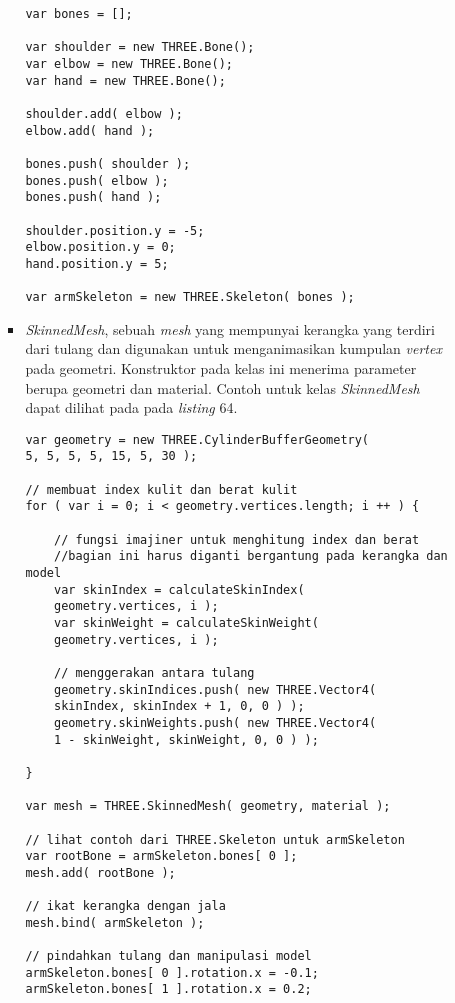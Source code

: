 \documentclass[a4paper,twoside]{article}
\begin{document}
\begin{enumerate}
\begin{itemize}
\begin{itemize}
\begin{lstlisting}[caption={Contoh penggunaan kelas {\it Skeleton}.},captionpos=b]
var bones = [];

var shoulder = new THREE.Bone();
var elbow = new THREE.Bone();
var hand = new THREE.Bone();

shoulder.add( elbow );
elbow.add( hand );

bones.push( shoulder );
bones.push( elbow );
bones.push( hand );

shoulder.position.y = -5;
elbow.position.y = 0;
hand.position.y = 5;

var armSkeleton = new THREE.Skeleton( bones );
\end{lstlisting}
	
	\item {\it SkinnedMesh}, sebuah {\it mesh} yang mempunyai kerangka yang terdiri dari tulang dan digunakan untuk menganimasikan kumpulan {\it vertex} pada geometri. Konstruktor pada kelas ini menerima parameter berupa geometri dan material. Contoh untuk kelas {\it SkinnedMesh} dapat dilihat pada pada {\it listing} 64.
	
\begin{lstlisting}[caption={Contoh penggunaan kelas {\it SkinnedMesh}.},captionpos=b]
var geometry = new THREE.CylinderBufferGeometry( 
5, 5, 5, 5, 15, 5, 30 );

// membuat index kulit dan berat kulit
for ( var i = 0; i < geometry.vertices.length; i ++ ) {

	// fungsi imajiner untuk menghitung index dan berat
	//bagian ini harus diganti bergantung pada kerangka dan model
	var skinIndex = calculateSkinIndex( 
	geometry.vertices, i );
	var skinWeight = calculateSkinWeight( 
	geometry.vertices, i );

	// menggerakan antara tulang
	geometry.skinIndices.push( new THREE.Vector4( 
	skinIndex, skinIndex + 1, 0, 0 ) );
	geometry.skinWeights.push( new THREE.Vector4(
	1 - skinWeight, skinWeight, 0, 0 ) );

}

var mesh = THREE.SkinnedMesh( geometry, material );

// lihat contoh dari THREE.Skeleton untuk armSkeleton
var rootBone = armSkeleton.bones[ 0 ];
mesh.add( rootBone );

// ikat kerangka dengan jala
mesh.bind( armSkeleton );

// pindahkan tulang dan manipulasi model
armSkeleton.bones[ 0 ].rotation.x = -0.1;
armSkeleton.bones[ 1 ].rotation.x = 0.2;
\end{lstlisting}
	

\end{itemize}
\end{itemize}
\end{enumerate}
\end{document}
